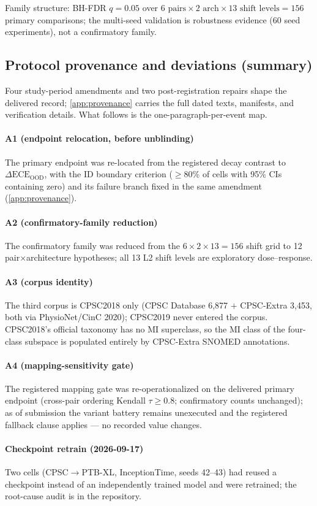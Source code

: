 \documentclass[final,5p,times,nonatbib]{elsarticle}
\begin{document}
Family structure: BH-FDR $q=0.05$ over $6\text{ pairs}\times 2\text{ arch}\times 13\text{ shift levels}=156$
primary comparisons; the multi-seed validation is robustness evidence
(60 seed experiments), not a confirmatory family.

\subsection{Protocol provenance and deviations (summary)}
\label{sec:provenance-summary}
Four study-period amendments and two post-registration repairs shape the
delivered record; \ref{app:provenance} carries the full dated
texts, manifests, and verification details. What follows is the
one-paragraph-per-event map.
\paragraph{A1 (endpoint relocation, before unblinding)} The primary
endpoint was re-located from the registered decay contrast to
$\Delta\text{ECE}_{\text{OOD}}$, with the ID boundary criterion
($\geq$80\% of cells with 95\% CIs containing zero) and its failure
branch fixed in the same amendment (\ref{app:provenance}).
\paragraph{A2 (confirmatory-family reduction)} The confirmatory family
was reduced from the $6\times2\times13=156$ shift grid to 12
pair$\times$architecture hypotheses; all 13 L2 shift levels are
exploratory dose--response.
\paragraph{A3 (corpus identity)} The third corpus is CPSC2018 only
(CPSC Database 6,877 $+$ CPSC-Extra 3,453, both via PhysioNet/CinC
2020); CPSC2019 never entered the corpus. CPSC2018's official taxonomy
has no MI superclass, so the MI class of the four-class subspace is
populated entirely by CPSC-Extra SNOMED annotations.
\paragraph{A4 (mapping-sensitivity gate)} The registered mapping gate
was re-operationalized on the delivered primary endpoint (cross-pair
ordering Kendall $\tau \geq 0.8$; confirmatory counts unchanged); as of
submission the variant battery remains unexecuted and the registered
fallback clause applies --- no recorded value changes.
\paragraph{Checkpoint retrain (2026-09-17)} Two cells
(CPSC$\rightarrow$PTB-XL, InceptionTime, seeds 42--43) had reused a
checkpoint instead of an independently trained model and were retrained;
the root-cause audit is in the repository.
\end{document}
